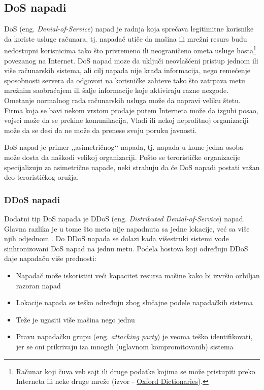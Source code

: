 \documentclass[a4paper]{article}
\theoremstyle{break}
\begin{document}
{\subsection{DoS napadi}
\label{subsec:DoS}

DoS (eng. {\em Denial-of-Service}) napad je radnja koja sprečava legitimitne korisnike da koriste usluge računara, tj. napadač utiče da mašina ili mrežni resurs  budu nedostupni korisnicima tako što privremeno ili neograničeno ometa usluge hosta\footnote{Računar koji čuva veb sajt ili druge podatke kojima se može pristupiti preko Interneta ili neke druge mreže (izvor - \href{https://en.oxforddictionaries.com/definition/host}{Oxford Dictionaries}).} povezanog na Internet. DoS napad moze da uključi neovlašćeni pristup jednom ili više računarskih sistema, ali cilj napada nije krađa informacija, nego remećenje sposobnosti servera da odgovori na korisničke zahteve tako što zatrpava metu mrežnim saobraćajem ili šalje informacije koje aktiviraju razne nezgode. Ometanje normalnog rada računarskih usluga može da napravi veliku štetu. Firma koja se bavi nekom vrstom prodaje putem Interneta može da izgubi posao, vojsci može da se prekine komunikacija, Vladi ili nekoj neprofitnoj organizaciji može da se desi da ne može da prenese svoju poruku javnosti.

DoS napad je primer ,,asimetričnog‘‘ napada, tj. napada u kome jedna osoba može dosta da naškodi velikoj organizaciji. Pošto se terorističke organizacije specijalizuju za asimetrične napade, neki strahuju da će DoS napadi postati važan deo terorističkog oružja.

\subsubsection{DDoS napadi}
\label{subsubsec:DDoS}

Dodatni tip DoS napada je DDoS (eng. {\em Distributed Denial-of-Service}) napad. Glavna razlika je u tome što meta nije napadnuta sa jedne lokacije, već sa više njih odjednom \cite{ddos}. Do DDoS napada se dolazi kada višestruki sistemi vode sinhronizovani DoS napad na jednu metu. Podela hostova koji određuju DDoS daje napadaču više prednosti:
\begin{itemize}
\item Napadač može iskoristiti veći kapacitet resursa mašine kako bi izvršio ozbiljan razoran napad
\item Lokacije napada se teško određuju zbog slučajne podele napadačkih sistema
\item Teže je ugasiti više mašina nego jednu
\item Pravu napadačku grupu (eng. {\em attacking party}) je veoma teško identifikovati, jer se oni prikrivaju iza mnogih (uglavnom kompromitovanih) sistema
\end{itemize}

}
\end{document}
